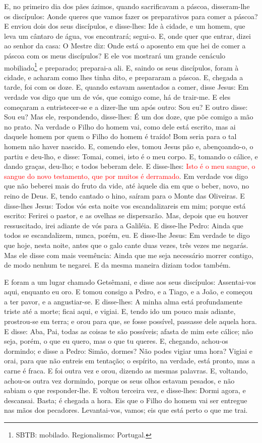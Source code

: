 E, no primeiro dia dos pães ázimos, quando sacrificavam a páscoa,
disseram-lhe os discípulos: Aonde queres que vamos fazer os
preparativos para comer a páscoa? E enviou dois dos seus
discípulos, e disse-lhes: Ide à cidade, e um homem, que leva um
cântaro de água, vos encontrará; segui-o. E, onde quer que
entrar, dizei ao senhor da casa: O Mestre diz: Onde está o aposento
em que hei de comer a páscoa com os meus discípulos? E ele
vos mostrará um grande cenáculo mobiliado\footnote{SBTB: mobilado.
Regionalismo: Portugal.} e preparado; preparai-a ali. E,
saindo os seus discípulos, foram à cidade, e acharam como lhes tinha
dito, e prepararam a páscoa. E, chegada a tarde, foi com os
doze. E, quando estavam assentados a comer, disse Jesus: Em
verdade vos digo que um de vós, que comigo come, há de trair-me.
E eles começaram a entristecer-se e a dizer-lhe um após
outro: Sou eu? E outro disse: Sou eu? Mas ele, respondendo,
disse-lhes: É um dos doze, que põe comigo a mão no prato. Na
verdade o Filho do homem vai, como dele está escrito, mas ai daquele
homem por quem o Filho do homem é traído! Bom seria para o tal homem
não haver nascido. E, comendo eles, tomou Jesus pão e,
abençoando-o, o partiu e deu-lho, e disse: Tomai, comei, isto é o
meu corpo. E, tomando o cálice, e dando graças, deu-lho; e
todos beberam dele. E disse-lhes: \textcolor{red}{Isto é o meu
sangue, o sangue do novo testamento, que por muitos é derramado}.
Em verdade vos digo que não beberei mais do fruto da vide,
até àquele dia em que o beber, novo, no reino de Deus. E,
tendo cantado o hino, saíram para o Monte das Oliveiras. E
disse-lhes Jesus: Todos vós esta noite vos escandalizareis em mim;
porque está escrito: Ferirei o pastor, e as ovelhas se dispersarão.
Mas, depois que eu houver ressuscitado, irei adiante de vós
para a Galiléia. E disse-lhe Pedro: Ainda que todos se
escandalizem, nunca, porém, eu. E disse-lhe Jesus: Em verdade
te digo que hoje, nesta noite, antes que o galo cante duas vezes,
três vezes me negarás. Mas ele disse com mais veemência:
Ainda que me seja necessário morrer contigo, de modo nenhum te
negarei. E da mesma maneira diziam todos também.

E foram a um lugar chamado Getsêmani, e disse aos seus
discípulos: Assentai-vos aqui, enquanto eu oro. E tomou
consigo a Pedro, e a Tiago, e a João, e começou a ter pavor, e a
angustiar-se. E disse-lhes: A minha alma está profundamente
triste até a morte; ficai aqui, e vigiai. E, tendo ido um
pouco mais adiante, prostrou-se em terra; e orou para que, se fosse
possível, passasse dele aquela hora. E disse: Aba, Pai, todas
as coisas te são possíveis; afasta de mim este cálice; não seja,
porém, o que eu quero, mas o que tu queres. E, chegando,
achou-os dormindo; e disse a Pedro: Simão, dormes? Não podes vigiar
uma hora? Vigiai e orai, para que não entreis em tentação; o
espírito, na verdade, está pronto, mas a carne é fraca. E foi
outra vez e orou, dizendo as mesmas palavras. E, voltando,
achou-os outra vez dormindo, porque os seus olhos estavam pesados, e
não sabiam o que responder-lhe. E voltou terceira vez, e
disse-lhes: Dormi agora, e descansai. Basta; é chegada a hora. Eis
que o Filho do homem vai ser entregue nas mãos dos pecadores.
Levantai-vos, vamos; eis que está perto o que me trai.

